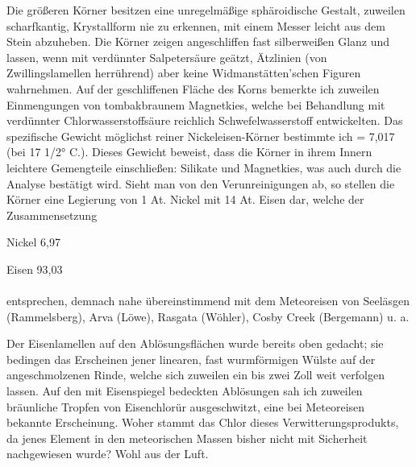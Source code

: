 \documentclass[a4paper, 11pt, oneside, german]{article}
\begin{document}
Die größeren Körner besitzen eine unregelmäßige sphäroidische Gestalt, zuweilen scharfkantig, Krystallform nie zu erkennen, mit einem Messer leicht aus dem Stein abzuheben. Die Körner zeigen angeschliffen fast silberweißen Glanz und lassen, wenn mit verdünnter Salpetersäure geätzt, Ätzlinien (von Zwillingslamellen herrührend) aber keine Widmanstätten'schen Figuren wahrnehmen. Auf der geschliffenen Fläche des Korns bemerkte ich zuweilen Einmengungen von tombakbraunem Magnetkies, welche bei Behandlung mit verdünnter Chlorwasserstoffsäure reichlich Schwefelwasserstoff entwickelten. Das spezifische Gewicht möglichst reiner Nickeleisen-Körner bestimmte ich = 7,017 (bei 17 1/2° C.). Dieses Gewicht beweist, dass die Körner in ihrem Innern leichtere Gemengteile einschließen: Silikate und Magnetkies, was auch durch die Analyse bestätigt wird. Sieht man von den Verunreinigungen ab, so stellen die Körner eine Legierung von 1 At. Nickel mit 14 At. Eisen dar, welche der Zusammensetzung
\begin{center}
Nickel 6,97

Eisen 93,03
\end{center}
\paragraph{}
entsprechen, demnach nahe übereinstimmend mit dem Meteoreisen von Seeläsgen (Rammelsberg), Arva (Löwe), Rasgata (Wöhler), Cosby Creek (Bergemann) u. a.

Der Eisenlamellen auf den Ablösungsflächen wurde bereits oben gedacht; sie bedingen das Erscheinen jener linearen, fast wurmförmigen Wülste auf der angeschmolzenen Rinde, welche sich zuweilen ein bis zwei Zoll weit verfolgen lassen. Auf den mit Eisenspiegel bedeckten Ablösungen sah ich zuweilen bräunliche Tropfen von Eisenchlorür ausgeschwitzt, eine bei Meteoreisen bekannte Erscheinung. Woher stammt das Chlor dieses Verwitterungsprodukts, da jenes Element in den meteorischen Massen bisher nicht mit Sicherheit nachgewiesen wurde? Wohl aus der Luft.
\end{document}
